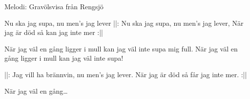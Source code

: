 \begin{song}

\begin{songmeta}
Melodi: Gravölsvisa från Rengsjö
\end{songmeta}

\begin{songtext}
Nu ska jag supa, nu men's jag lever
\noindent||: Nu ska jag supa, nu men's jag lever,
När jag är död så kan jag inte mer :||

När jag väl en gång ligger i mull
kan jag väl inte supa mig full.
När jag väl en gång ligger i mull
kan jag väl inte supa!

||: Jag vill ha brännvin, nu men's jag lever.
När jag är död så får jag inte mer. :||

När jag väl en gång\ldots
\end{songtext}

\end{song}
